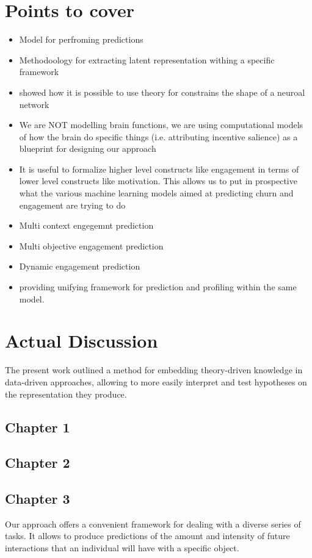 \section{Points to cover}
\begin{itemize}
    \item Model for perfroming predictions
    \item Methodoology for extracting latent representation withing a specific framework
    \item showed how it is possible to use theory for constrains the shape of a neuroal network
    \item We are NOT modelling brain functions, we are using computational models of how the brain do specific things (i.e. attributing incentive salience) as a blueprint for designing our approach
    \item It is useful to formalize higher level constructs like engagement in terms of lower level constructs like motivation. This allows us to put in prospective what the various machine learning models aimed at predicting churn and engagement are trying to do
    \item Multi context engegemnt prediction
    \item Multi objective engagement prediction
    \item Dynamic engagement prediction
    \item providing unifying framework for prediction and profiling within the same model.
\end{itemize}

\section{Actual Discussion}
The present work outlined a method for embedding theory-driven knowledge in data-driven approaches, allowing to more easily interpret and test hypotheses on the representation they produce. 

\subsection{Chapter 1}

\subsection{Chapter 2}

\subsection{Chapter 3}
Our approach offers a convenient framework for dealing with a diverse series of tasks. It allows to produce predictions of the amount and intensity of future interactions that an individual will have with a specific object.

